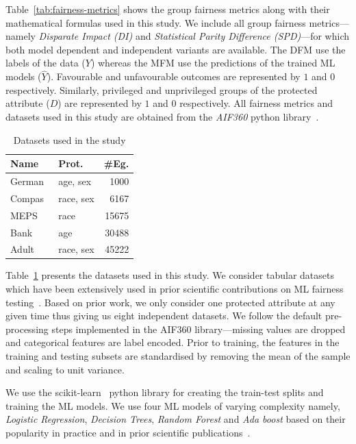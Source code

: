 \documentclass[sigconf]{acmart}
\begin{document}
Table \ref{tab:fairness-metrics} shows the group fairness metrics
along with their mathematical formulas used in this study. We include
all group fairness metrics---namely \emph{Disparate Impact (DI)} and
\emph{Statistical Parity Difference (SPD)}---for which both model
dependent and independent variants are available. The DFM use the
labels of the data ($Y$) whereas the MFM use the predictions of the
trained ML models ($\hat{Y}$). Favourable and unfavourable outcomes
are represented by $1$ and $0$ respectively. Similarly, privileged and
unprivileged groups of the protected attribute ($D$) are represented
by $1$ and $0$ respectively. All fairness metrics and datasets used in
this study are obtained from the \emph{AIF360} python
library \cite{bellamy2019ai}.

\begin{table}
  \centering
  \caption{Datasets used in the study}
  \begin{tabular}{l l r}
    \hline
    \textbf{Name} & \textbf{Prot.} & \textbf{\#Eg.}\\
    \hline
    German \cite{hofmann1994german} & age, sex & 1000\\
    Compas\cite{angwin2016machine} & race, sex & 6167\\
    MEPS \cite{mepsdata} & race & 15675\\
    Bank\cite{moro2014data} & age & 30488\\
    Adult\cite{kohavi1996scaling} & race, sex & 45222\\
    \hline
  \end{tabular}
  \label{tab:datasets}
\end{table}

Table \ref{tab:datasets} presents the datasets used in this study. We
consider tabular datasets which have been extensively used in prior
scientific contributions on ML fairness
testing \cite{zhang2021ignorance,biswas2020machine,biswas2021fair,chen2022fairness}. Based
on prior work, we only consider one protected attribute at any given
time thus giving us eight independent datasets. We follow the default
pre-processing steps implemented in the AIF360 library---missing
values are dropped and categorical features are label encoded. Prior
to training, the features in the training and testing subsets are
standardised by removing the mean of the sample and scaling to unit
variance.

We use the scikit-learn \cite{pedregosa2011scikit} python library for
creating the train-test splits and training the ML models. We use four
ML models of varying complexity namely, \emph{Logistic Regression},
\emph{Decision Trees}, \emph{Random Forest} and \emph{Ada boost} based
on their popularity in practice and in prior scientific
publications \cite{zhang2021ignorance,biswas2021fair,biswas2020machine}.
\end{document}
